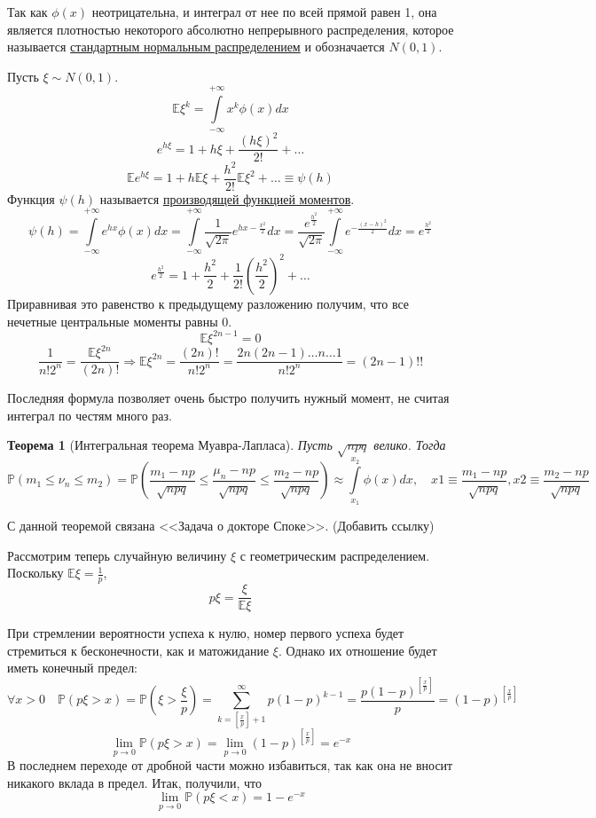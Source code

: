 \documentclass[12pt]{article}
\newtheorem{Th}{Теорема}
\numberwithin{Th}{section}
\numberwithin{Def}{section}
\numberwithin{Lem}{section}
\numberwithin{St}{section}
\numberwithin{equation}{section}
\newcommand\Sum[3]{\sum\limits_{#1 = #2}^{#3}}
\newcommand\Pro{\mathbb{P}} %
\newcommand\Expec{\mathbb{E}} %
\begin{document}
Так как $\phi(x)$ неотрицательна, и интеграл от нее по всей прямой равен 1, она является плотностью некоторого абсолютно непрерывного распределения, которое называется \underline{стандартным нормальным распределением} и обозначается $N(0, 1)$.

Пусть $\xi \sim N(0,1)$.
$$\Expec\xi^k = \int\limits_{-\infty}^{+\infty}x^k\phi(x)dx$$
$$e^{h\xi}=1 + h\xi + \frac{(h\xi)^2}{2!} + \ldots$$
$$\Expec e^{h\xi} = 1 + h\Expec\xi + \frac{h^2}{2!}\Expec\xi^2 + \ldots \equiv \psi(h)$$
Функция $\psi(h)$ называется \underline{производящей функцией моментов}.
$$\psi(h) = \int\limits_{-\infty}^{+\infty}e^{hx}\phi(x)dx = \int\limits_{-\infty}^{+\infty}\frac{1}{\sqrt{2\pi}}e^{hx-\frac{x^2}2}dx = \frac{e^{\frac{h^2}2}}{\sqrt{2\pi}}\int\limits_{-\infty}^{+\infty}e^{-\frac{(x-h)^2}2}dx = e^{\frac{h^2}2}$$
$$e^{\frac{h^2}2} = 1 + \frac{h^2}2 + \frac1{2!}(\frac{h^2}2)^2 + \ldots$$
Приравнивая это равенство к предыдущему разложению получим, что все нечетные центральные моменты равны 0.
$$\Expec\xi^{2n-1} = 0$$
$$\frac{1}{n!2^n} = \frac{\Expec\xi^{2n}}{(2n)!} \Rightarrow \Expec\xi^{2n} = \frac{(2n)!}{n!2^n} = \frac{2n(2n-1)\ldots n \ldots 1}{n!2^n} = (2n-1)!!$$

Последняя формула позволяет очень быстро получить нужный момент, не считая интеграл по честям много раз.

\begin{Th}[Интегральная теорема Муавра-Лапласа]
Пусть $\sqrt{npq}$ велико. Тогда
$$\Pro(m_1 \le \nu_n \le m_2) = \Pro(\frac{m_1 - np}{\sqrt{npq}} \le \frac{\mu_n - np}{\sqrt{npq}} \le \frac{m_2 - np}{\sqrt{npq}}) \approx \int\limits_{x_1}^{x_2}\phi(x)dx, \quad x1 \equiv \frac{m_1 - np}{\sqrt{npq}}, x2 \equiv\frac{m_2 - np}{\sqrt{npq}}$$
\end{Th}

С данной теоремой связана <<Задача о докторе Споке>>. (Добавить ссылку)

Рассмотрим теперь случайную величину $\xi$ с геометрическим распределением. Поскольку $\Expec\xi = \frac1p$, 
$$p\xi=\frac{\xi}{\Expec\xi}$$

При стремлении вероятности успеха к нулю, номер первого успеха будет стремиться к бесконечности, как и матожидание $\xi$. Однако их отношение будет иметь конечный предел:
$$\forall x > 0 \quad \Pro(p\xi > x) = \Pro(\xi > \frac{\xi}p) = \Sum{k}{[\frac{x}{p}] + 1}{\infty}p(1-p)^{k-1} = \frac{p(1-p)^{[\frac{x}p]}}p = (1-p)^{[\frac{x}p]}$$ 
$$\lim\limits_{p \to 0} \Pro(p\xi > x) = \lim\limits_{p \to 0}(1-p)^{[\frac{x}p]} = e^{-x}$$
В последнем переходе от дробной части можно избавиться, так как она не вносит никакого вклада в предел.
Итак, получили, что
$$\lim\limits_{p \to 0} \Pro(p\xi < x) = 1 - e^{-x}$$
\end{document}
